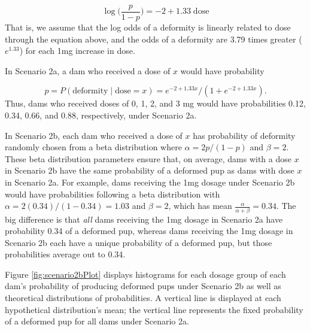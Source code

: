 \documentclass[
]{krantz}
\begin{document}
\[ \log \bigg(\frac{p}{1-p} \bigg) = -2 + 1.33\; \textrm{dose} \]
That is, we assume that the log odds of a deformity is linearly related to dose through the equation above, and the odds of a deformity are 3.79 times greater (\(e^{1.33}\)) for each 1mg increase in dose.

In Scenario 2a, a dam who received a dose of \(x\) would have probability

\[p = P(\textrm{deformity}\mid \textrm{dose} = x) = e^{-2+1.33x}/(1+e^{-2+1.33x}). \]
Thus, dams who received doses of 0, 1, 2, and 3 mg would have probabilities 0.12, 0.34, 0.66, and 0.88, respectively, under Scenario 2a.

In Scenario 2b, each dam who received a dose of \(x\) has probability of deformity randomly chosen from a beta distribution where \(\alpha = 2p/(1-p)\) and \(\beta = 2\). These beta distribution parameters ensure that, on average, dams with a dose \(x\) in Scenario 2b have the same probability of a deformed pup as dams with dose \(x\) in Scenario 2a. For example, dams receiving the 1mg dosage under Scenario 2b would have probabilities following a beta distribution with \(\alpha = 2(0.34)/(1-0.34) = 1.03\) and \(\beta = 2\), which has mean \(\frac{\alpha}{\alpha + \beta}=0.34\). The big difference is that \emph{all} dams receiving the 1mg dosage in Scenario 2a have probability 0.34 of a deformed pup, whereas dams receiving the 1mg dosage in Scenario 2b each have a unique probability of a deformed pup, but those probabilities average out to 0.34.

Figure \ref{fig:scenario2bPlot} displays histograms for each dosage group of each dam's probability of producing deformed pups under Scenario 2b as well as theoretical distributions of probabilities. A vertical line is displayed at each hypothetical distribution's mean; the vertical line represents the fixed probability of a deformed pup for all dams under Scenario 2a.
\end{document}
